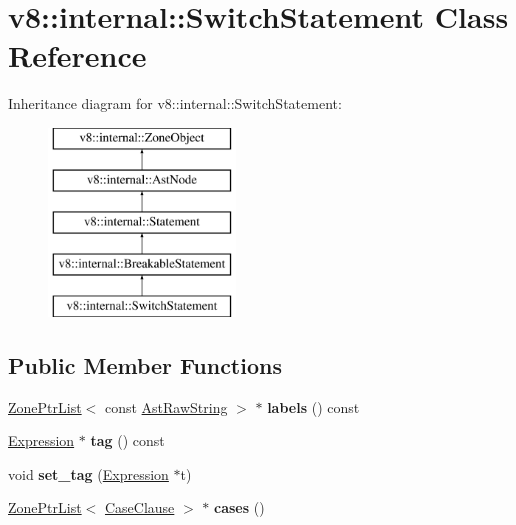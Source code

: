 \hypertarget{classv8_1_1internal_1_1SwitchStatement}{}\section{v8\+:\+:internal\+:\+:Switch\+Statement Class Reference}
\label{classv8_1_1internal_1_1SwitchStatement}
Inheritance diagram for v8\+:\+:internal\+:\+:Switch\+Statement\+:\begin{figure}[H]
\begin{center}
\leavevmode
\includegraphics[height=5.000000cm]{classv8_1_1internal_1_1SwitchStatement}
\end{center}
\end{figure}
\subsection*{Public Member Functions}
\begin{DoxyCompactItemize}
\item 
\mbox{\label{classv8_1_1internal_1_1SwitchStatement_af2d350fcc07a2075e3fc7891c510d817}} 
\mbox{\hyperlink{classv8_1_1internal_1_1ZoneList}{Zone\+Ptr\+List}}$<$ const \mbox{\hyperlink{classv8_1_1internal_1_1AstRawString}{Ast\+Raw\+String}} $>$ $\ast$ {\bfseries labels} () const
\item 
\mbox{\label{classv8_1_1internal_1_1SwitchStatement_aa17c9b77d41779bfb7a8ea8c6d4b59ee}} 
\mbox{\hyperlink{classv8_1_1internal_1_1Expression}{Expression}} $\ast$ {\bfseries tag} () const
\item 
\mbox{\label{classv8_1_1internal_1_1SwitchStatement_a4562fa4198dd3a8498360c65659ffd28}} 
void {\bfseries set\+\_\+tag} (\mbox{\hyperlink{classv8_1_1internal_1_1Expression}{Expression}} $\ast$t)
\item 
\mbox{\label{classv8_1_1internal_1_1SwitchStatement_a0a4df74c845909b8e54c1f44407defed}} 
\mbox{\hyperlink{classv8_1_1internal_1_1ZoneList}{Zone\+Ptr\+List}}$<$ \mbox{\hyperlink{classv8_1_1internal_1_1CaseClause}{Case\+Clause}} $>$ $\ast$ {\bfseries cases} ()
\end{DoxyCompactItemize}
